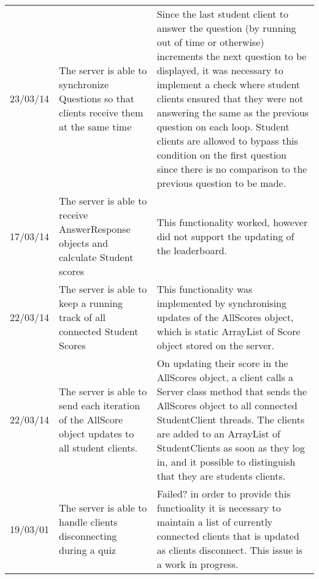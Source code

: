 \begin{longtabu}{l X X}
	23/03/14	&The server is able to synchronize Questions so that clients receive them at the same time	&Since the last student client to answer the question (by running out of time or otherwise) increments the next question to be displayed, it was necessary to implement a check where student clients ensured that they were not answering the same as the previous question on each loop. Student clients are allowed to bypass this condition on the first question since there is no comparison to the previous question to be made.\\
	17/03/14	&The server is able to receive AnswerResponse objects and calculate Student scores	&This functionality worked, however did not support the updating of the leaderboard.\\
	22/03/14	&The server is able to keep a running track of all connected Student Scores	&This functionality was implemented by synchronising updates of the AllScores object, which is static ArrayList of Score object stored on the server. \\
	22/03/14	&The server is able to send each iteration of the AllScore object updates to all student clients.	&On updating their score in the AllScores object, a client calls a Server class method that sends the AllScores object to all connected StudentClient threads. The clients are added to an ArrayList of StudentClients as soon as they log in, and it possible to distinguish that they are students clients.\\
	19/03/01	&The server is able to handle clients disconnecting during a quiz	&Failed? in order to provide this functioality it is necessary to maintain a list of currently connected clients that is updated as clients disconnect. This issue is a work in progress.\\
	\bottomrule
\end{longtabu}

